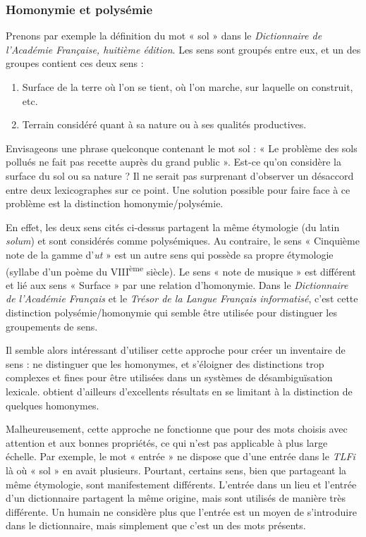 \subsubsection{Homonymie et polysémie}

Prenons par exemple la définition du mot « sol » dans le \textit{Dictionnaire
de l'Académie Française, huitième édition}. Les sens sont groupés entre eux, et
un des groupes contient ces deux sens :

\begin{enumerate}

  \item Surface de la terre où l'on se tient, où l'on marche, sur laquelle on
      construit, etc.

  \item Terrain considéré quant à sa nature ou à ses qualités productives.

\end{enumerate}

Envisageons une phrase quelconque contenant le mot sol : « Le problème des sols
pollués ne fait pas recette auprès du grand public ». Est-ce qu'on considère la
surface du sol ou sa nature ? Il ne serait pas surprenant d'observer un
désaccord entre deux lexicographes sur ce point. Une solution possible pour
faire face à ce problème est la distinction homonymie/polysémie.

En effet, les deux sens cités ci-dessus partagent la même étymologie (du latin
\textit{solum}) et sont considérés comme polysémiques. Au contraire, le sens «
Cinquième note de la gamme d'\textit{ut} » est un autre sens qui possède sa
propre étymologie (syllabe d'un poème du VIII\textsuperscript{ème} siècle). Le
sens « note de musique » est différent et lié aux sens « Surface » par une
relation d'homonymie. Dans le \textit{Dictionnaire de l'Académie Français} et
le \textit{Trésor de la Langue Français informatisé}, c'est cette distinction
polysémie/homonymie qui semble être utilisée pour distinguer les groupements de
sens.

Il semble alors intéressant d'utiliser cette approche pour créer un inventaire
de sens : ne distinguer que les homonymes, et s'éloigner des distinctions trop
complexes et fines pour être utilisées dans un systèmes de désambiguïsation
lexicale. \cite{yarowsky1995unsupervised} obtient d'ailleurs d'excellents
résultats en se limitant à la distinction de quelques homonymes.

Malheureusement, cette approche ne fonctionne que pour des mots choisis avec
attention et aux bonnes propriétés, ce qui n'est pas applicable à plus large
échelle. Par exemple, le mot « entrée » ne dispose que d'une entrée dans le
\textit{TLFi} là où « sol » en avait plusieurs. Pourtant, certains sens, bien
que partageant la même étymologie, sont manifestement différents. L'entrée dans
un lieu et l'entrée d'un dictionnaire partagent la même origine, mais sont
utilisés de manière très différente. Un humain ne considère plus que l'entrée
est un moyen de s'introduire dans le dictionnaire, mais simplement que c'est un
des mots présents.

